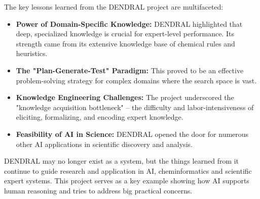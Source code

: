 \documentclass[12pt,a4paper]{article}
\begin{document}
The key lessons learned from the DENDRAL project are multifaceted:
\begin{itemize}
    \item \textbf{Power of Domain-Specific Knowledge:} DENDRAL highlighted that deep, specialized knowledge is crucial for expert-level performance. Its strength came from its extensive knowledge base of chemical rules and heuristics.
    \item \textbf{The "Plan-Generate-Test" Paradigm:} This proved to be an effective problem-solving strategy for complex domains where the search space is vast.
    \item \textbf{Knowledge Engineering Challenges:} The project underscored the "knowledge acquisition bottleneck" – the difficulty and labor-intensiveness of eliciting, formalizing, and encoding expert knowledge.
    \item \textbf{Feasibility of AI in Science:} DENDRAL opened the door for numerous other AI applications in scientific discovery and analysis.
\end{itemize}
DENDRAL may no longer exist as a system, but the things learned from it continue to guide research and application in AI, cheminformatics and scientific expert systems. This project serves as a key example showing how AI supports human reasoning and tries to address big practical concerns.


\newpage
\end{document}
